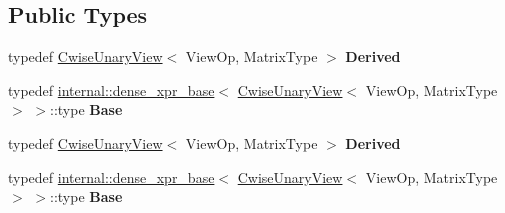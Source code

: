 \subsection*{Public Types}
\begin{DoxyCompactItemize}
\item 
\mbox{\label{class_eigen_1_1_cwise_unary_view_impl_3_01_view_op_00_01_matrix_type_00_01_dense_01_4_a967952b1f7ad8e450c76a4667a692600}} 
typedef \hyperlink{group___core___module_class_eigen_1_1_cwise_unary_view}{Cwise\+Unary\+View}$<$ View\+Op, Matrix\+Type $>$ {\bfseries Derived}
\item 
\mbox{\label{class_eigen_1_1_cwise_unary_view_impl_3_01_view_op_00_01_matrix_type_00_01_dense_01_4_a0c2bbafbe6a06b18c4275b8b0bfb9b64}} 
typedef \hyperlink{struct_eigen_1_1internal_1_1dense__xpr__base}{internal\+::dense\+\_\+xpr\+\_\+base}$<$ \hyperlink{group___core___module_class_eigen_1_1_cwise_unary_view}{Cwise\+Unary\+View}$<$ View\+Op, Matrix\+Type $>$ $>$\+::type {\bfseries Base}
\item 
\mbox{\label{class_eigen_1_1_cwise_unary_view_impl_3_01_view_op_00_01_matrix_type_00_01_dense_01_4_a967952b1f7ad8e450c76a4667a692600}} 
typedef \hyperlink{group___core___module_class_eigen_1_1_cwise_unary_view}{Cwise\+Unary\+View}$<$ View\+Op, Matrix\+Type $>$ {\bfseries Derived}
\item 
\mbox{\label{class_eigen_1_1_cwise_unary_view_impl_3_01_view_op_00_01_matrix_type_00_01_dense_01_4_a0c2bbafbe6a06b18c4275b8b0bfb9b64}} 
typedef \hyperlink{struct_eigen_1_1internal_1_1dense__xpr__base}{internal\+::dense\+\_\+xpr\+\_\+base}$<$ \hyperlink{group___core___module_class_eigen_1_1_cwise_unary_view}{Cwise\+Unary\+View}$<$ View\+Op, Matrix\+Type $>$ $>$\+::type {\bfseries Base}
\end{DoxyCompactItemize}
